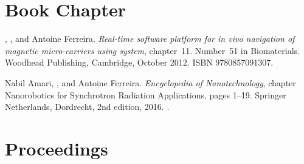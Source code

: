 \section{Book Chapter}

\begin{Mybibliography}{10}
  \KBelharet, \DavidFolio, and Antoine Ferreira.
  \newblock \emph{Real-time software platform for in vivo navigation of magnetic
    micro-carriers using {\MRI} system}, chapter~11.
  \newblock Number~51 in Biomaterials. Woodhead Publishing, Cambridge, October
  2012{}.
  \newblock ISBN 9780857091307.
  
  Nabil Amari, \DavidFolio, and Antoine Ferreira.
  \newblock \emph{Encyclopedia of Nanotechnology}, chapter Nanorobotics for
  Synchrotron Radiation Applications, pages 1--19.
  \newblock Springer Netherlands, Dordrecht, 2nd edition, 2016.
  \newblock {}.
\end{Mybibliography}


\section{Proceedings}

